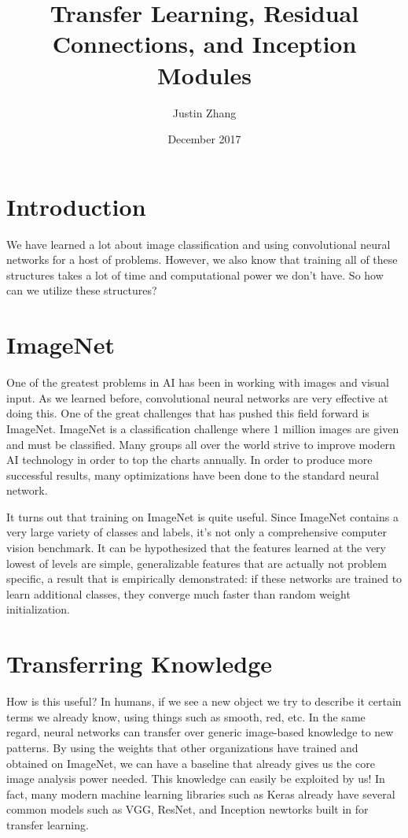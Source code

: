 \documentclass{article}
\title{Transfer Learning, Residual Connections, and Inception Modules}
\author{Justin Zhang}
\date{December 2017}
\begin{document}
\maketitle

\section{Introduction}
We have learned a lot about image classification and using convolutional neural networks for a host of problems. However, we also know that training all of these structures takes a lot of time and computational power we don't have. So how can we utilize these structures?

\section{ImageNet}

One of the greatest problems in AI has been in working with images and visual input. As we learned before, convolutional neural networks are very effective at doing this. One of the great challenges that has pushed this field forward is ImageNet. ImageNet is a classification challenge where 1 million images are given and must be classified. Many groups all over the world strive to improve modern AI technology in order to top the charts annually. In order to produce more successful results, many optimizations have been done to the standard neural network.

It turns out that training on ImageNet is quite useful. Since ImageNet contains a very large variety of classes and labels, it's not only a comprehensive computer vision benchmark. It can be hypothesized that the features learned at the very lowest of levels are simple, generalizable features that are actually not problem specific, a result that is empirically demonstrated: if these networks are trained to learn additional classes, they converge much faster than random weight initialization.



\section{Transferring Knowledge}
How is this useful? In humans, if we see a new object we try to describe it certain terms we already know, using things such as smooth, red, etc. In the same regard, neural networks can transfer over generic image-based knowledge to new patterns. By using the weights that other organizations have trained and obtained on ImageNet, we can have a baseline that already gives us the core image analysis power needed. This knowledge can easily be exploited by us! In fact, many modern machine learning libraries such as Keras already have several common models such as VGG, ResNet, and Inception newtorks built in for transfer learning.
\end{document}
